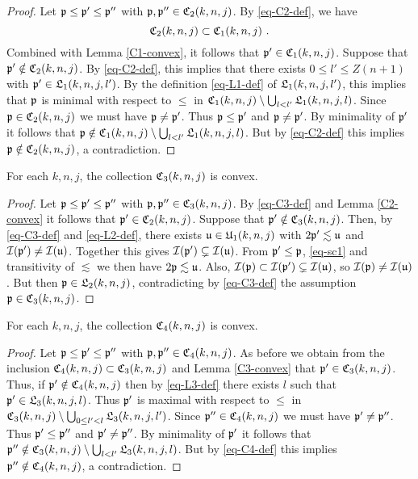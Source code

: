 {\begin{proof}
     Let ${\mathfrak p} \le {\mathfrak p}' \le {\mathfrak p}''$ with ${\mathfrak p}, {\mathfrak p}'' \in {\mathfrak C}_2(k,n,j)$. By \eqref{eq-C2-def}, we have
     \begin{equation*}
         \fC_2(k,n,j) \subset \fC_1(k,n,j)\ .
     \end{equation*} Combined with Lemma \ref{C1-convex}, it follows that ${\mathfrak p}' \in {\mathfrak C}_1(k,n,j)$. Suppose that ${\mathfrak p}' \notin {\mathfrak C}_2(k,n,j)$. By \eqref{eq-C2-def}, this implies that there exists $0 \le l' \le Z(n+1)$ with ${\mathfrak p}' \in {\mathfrak L}_1(k,n,j,l')$. By the definition \eqref{eq-L1-def} of ${\mathfrak L}_1(k,n,j,l')$, this implies that ${\mathfrak p}$ is minimal with respect to $\le$  in ${\mathfrak C}_1(k,n,j) \setminus \bigcup_{l < l'} {\mathfrak L}_1(k,n,j,l)$. Since ${\mathfrak p} \in {\mathfrak C}_2(k,n,j)$ we must have ${\mathfrak p} \ne {\mathfrak p}'$. Thus ${\mathfrak p} \le {\mathfrak p}'$ and ${\mathfrak p} \ne {\mathfrak p}'$. By minimality of ${\mathfrak p}'$ it follows that ${\mathfrak p} \notin {\mathfrak C}_1(k,n,j) \setminus \bigcup_{l < l'} {\mathfrak L}_1(k,n,j,l)$. But by \eqref{eq-C2-def} this implies ${\mathfrak p} \notin {\mathfrak C}_2(k,n,j)$, a contradiction.
\end{proof}

\begin{lemma}[C3 convex]
    \label{C3-convex}
    For each $k,n,j$, the collection ${\mathfrak C}_3(k,n,j)$ is convex.
\end{lemma}

\begin{proof}
    Let ${\mathfrak p} \le {\mathfrak p}' \le {\mathfrak p}''$ with ${\mathfrak p}, {\mathfrak p}'' \in {\mathfrak C}_3(k,n,j)$. By \eqref{eq-C3-def} and Lemma \ref{C2-convex} it follows that ${\mathfrak p}' \in {\mathfrak C}_2(k,n,j)$. Suppose that ${\mathfrak p}' \notin {\mathfrak C}_3(k,n,j)$. Then, by \eqref{eq-C3-def} and \eqref{eq-L2-def}, there exists ${\mathfrak u} \in {\mathfrak U}_1(k,n,j)$ with $2{\mathfrak p}' \lesssim {\mathfrak u}$ and ${\mathcal{I}}({\mathfrak p}') \ne {\mathcal{I}}({\mathfrak u})$. Together this gives ${\mathcal{I}}({\mathfrak p}') \subsetneq {\mathcal{I}}({\mathfrak u})$. From ${\mathfrak p}' \le {\mathfrak p}$, \eqref{eq-sc1} and transitivity of $\lesssim$ we then have $2{\mathfrak p} \lesssim {\mathfrak u}$. Also, ${\mathcal{I}}({\mathfrak p}) \subset {\mathcal{I}}({\mathfrak p}') \subsetneq {\mathcal{I}}({\mathfrak u})$, so ${\mathcal{I}}({\mathfrak p}) \ne {\mathcal{I}}({\mathfrak u})$. But then ${\mathfrak p} \in {\mathfrak L}_2(k,n,j)$, contradicting by \eqref{eq-C3-def} the assumption ${\mathfrak p} \in {\mathfrak C}_3(k,n,j)$.
\end{proof}

\begin{lemma}[C4 convex]
    \label{C4-convex}
    For each $k,n,j$, the collection ${\mathfrak C}_4(k,n,j)$ is convex.
\end{lemma}

\begin{proof}
    Let ${\mathfrak p} \le {\mathfrak p}' \le{\mathfrak p}''$ with ${\mathfrak p}, {\mathfrak p}'' \in {\mathfrak C}_4(k,n,j)$. As before we obtain from the inclusion ${\mathfrak C}_4(k,n,j) \subset {\mathfrak C}_3(k,n,j)$ and Lemma \ref{C3-convex} that ${\mathfrak p}' \in {\mathfrak C}_3(k,n,j)$. Thus, if ${\mathfrak p}' \notin {\mathfrak C}_4(k,n,j)$ then by \eqref{eq-L3-def} there exists $l$ such that ${\mathfrak p}' \in {\mathfrak L}_3(k,n,j,l)$. Thus ${\mathfrak p}'$ is maximal with respect to $\le$ in ${\mathfrak C}_3(k,n,j) \setminus \bigcup_{0 \le l' < l} {\mathfrak L}_3(k,n,j,l')$.  Since ${\mathfrak p}'' \in {\mathfrak C}_4(k,n,j)$ we must have ${\mathfrak p}' \ne {\mathfrak p}''$. Thus ${\mathfrak p}' \le {\mathfrak p}''$ and ${\mathfrak p}'\ne {\mathfrak p}''$. By minimality of ${\mathfrak p}'$ it follows that ${\mathfrak p}'' \notin {\mathfrak C}_3(k,n,j) \setminus \bigcup_{l < l'} {\mathfrak L}_3(k,n,j,l)$. But by \eqref{eq-C4-def} this implies ${\mathfrak p}'' \notin {\mathfrak C}_4(k,n,j)$, a contradiction.
\end{proof}

}
